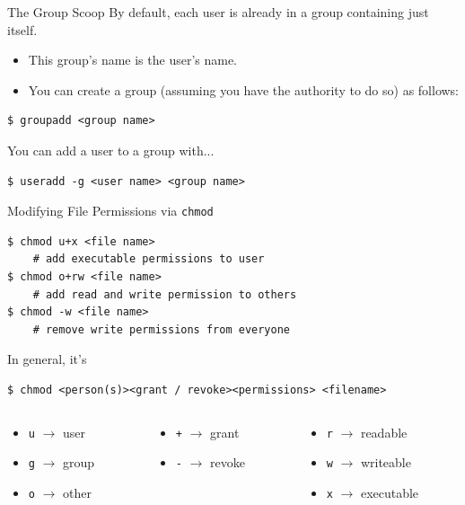 \documentclass[11pt]{beamer}
\begin{document}
\begin{frame}[fragile=singleslide]{The Group Scoop}
By default, each user is already in a group containing just itself.
\begin{itemize}
\item This group's name is the user's name.
\item You can create a group (assuming you have the authority to do so) as follows:
\end{itemize}
\begin{lstlisting}[style=terminal]
$ groupadd <group name>
\end{lstlisting}
You can add a user to a group with...
\begin{lstlisting}[style=terminal]
$ useradd -g <user name> <group name>
\end{lstlisting}
\end{frame}

\begin{frame}[fragile=singleslide]{Modifying File Permissions via \texttt{chmod}}
\begin{lstlisting}[style=terminal]
$ chmod u+x <file name>
    # add executable permissions to user
$ chmod o+rw <file name>
    # add read and write permission to others
$ chmod -w <file name>
    # remove write permissions from everyone
\end{lstlisting}
In general, it's 
\begin{lstlisting}[style=terminal]
$ chmod <person(s)><grant / revoke><permissions> <filename>
\end{lstlisting}
\begin{columns}
\begin{column}{0.31\textwidth}
\begin{itemize}
\item \texttt{u} $\rightarrow$ user
\item \texttt{g} $\rightarrow$ group
\item \texttt{o} $\rightarrow$ other
\end{itemize}
\end{column}
\begin{column}{0.31\textwidth}
\begin{itemize}
\item \texttt{+} $\rightarrow$ grant
\item \texttt{-} $\rightarrow$ revoke
\end{itemize}
\end{column}
\begin{column}{0.31\textwidth}
\begin{itemize}
\item \texttt{r} $\rightarrow$ readable
\item \texttt{w} $\rightarrow$ writeable
\item \texttt{x} $\rightarrow$ executable
\end{itemize}
\end{column}
\end{columns}
\end{frame}
\end{document}
